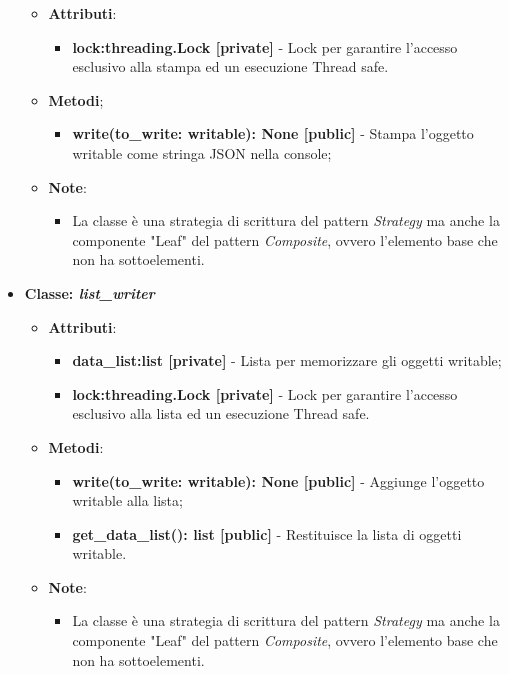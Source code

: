 \begin{itemize}
    \begin{itemize}
    \item\textbf{Attributi}:
        \begin{itemize}
        \item \textbf{lock:threading.Lock [private]} - Lock per garantire l'accesso esclusivo alla stampa ed un esecuzione Thread safe.
    \end{itemize}
    \item \textbf{Metodi};
    \begin{itemize}
        \item \textbf{write(to\_write: writable): None [public]} - Stampa l'oggetto writable come stringa JSON nella console;
    \end{itemize}
    \item\textbf{Note}:
        \begin{itemize}
            \item La classe è una strategia di scrittura del pattern \textit{Strategy} ma anche la componente "Leaf" del pattern \textit{Composite}, ovvero l'elemento base che non ha sottoelementi.
        \end{itemize}
    \end{itemize}
    \item{\textbf{Classe: \textit{list\_writer}}}
    \begin{itemize}
    \item\textbf{Attributi}:
        \begin{itemize}
        \item \textbf{data\_list:list [private]} - Lista per memorizzare gli oggetti writable;
        \item \textbf{lock:threading.Lock [private]} - Lock per garantire l'accesso esclusivo alla lista ed un esecuzione Thread safe.
    \end{itemize}
    \item \textbf{Metodi}:
    \begin{itemize}
        \item \textbf{write(to\_write: writable): None [public]} - Aggiunge l'oggetto writable alla lista;
        \item \textbf{get\_data\_list(): list [public]} - Restituisce la lista di oggetti writable.
    \end{itemize}
    \item\textbf{Note}:
        \begin{itemize}
            \item La classe è una strategia di scrittura del pattern \textit{Strategy} ma anche la componente "Leaf" del pattern \textit{Composite}, ovvero l'elemento base che non ha sottoelementi.

\end{itemize}
\end{itemize}
\end{itemize}
